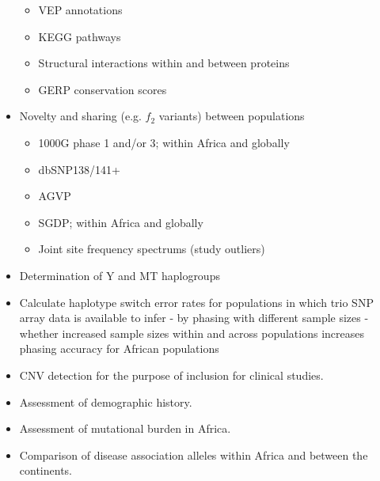 \begin{itemize}
\begin{itemize}
   \item{VEP annotations}
   \item{KEGG pathways}
   \item{Structural interactions within and between proteins
   }
   \item{GERP conservation scores}
  \end{itemize}
 \item Novelty and sharing (e.g. $f_2$ variants) between populations
 \begin{itemize}
  \item 1000G phase 1 and/or 3; within Africa and globally
  \item dbSNP138/141+
  \item AGVP
  \item SGDP; within Africa and globally
  \item Joint site frequency spectrums (study outliers)
 \end{itemize}
 \item{Determination of Y and MT haplogroups
 }
 \item {Calculate haplotype switch error rates for populations in which trio SNP array data is available to infer - by phasing with different sample sizes - whether increased sample sizes within and across populations increases phasing accuracy for African populations
 }
  \item CNV detection for the purpose of inclusion for clinical studies.
  \item Assessment of demographic history.
  \item Assessment of mutational burden in Africa.
  \item Comparison of disease association alleles within Africa and between the continents.
\end{itemize}

